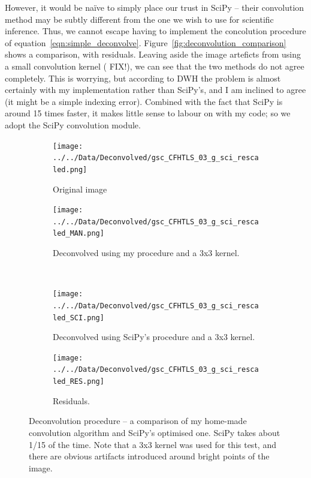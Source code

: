 \documentclass[letterpaper, 11pt]{article}
\def\MORE{{\color{red}{\bf MORE}}\xspace}
\begin{document}
However, it would be na\"ive to simply place our trust in SciPy -- their convolution method may be subtly different from the one we wish to use for scientific inference. Thus, we cannot escape having to implement the concolution procedure of equation~\ref{eqn:simple_deconvolve}. Figure~\vref{fig:deconvolution_comparison} shows a comparison, with residuals. Leaving aside the image arteficts from using a small convolution kernel (\MORE FIX!), we can see that the two methods do not agree completely. This is worrying, but according to DWH the problem is almost certainly with my implementation rather than SciPy's, and I am inclined to agree (it might be a simple indexing error). Combined with the fact that SciPy is around 15 times faster, it makes little sense to labour on with my code; so we adopt the SciPy convolution module.

\begin{figure}
	\def\width{0.3\textwidth}
	\centering
	\begin{subfigure}{\width}
		\texttt{[image: ../../Data/Deconvolved/gsc\_CFHTLS\_03\_g\_sci\_rescaled.png]}
		\caption{Original image}
	\end{subfigure}
	
	\begin{subfigure}{\width}
		\texttt{[image: ../../Data/Deconvolved/gsc\_CFHTLS\_03\_g\_sci\_rescaled\_MAN.png]}
		\caption{Deconvolved using my procedure and a 3x3 kernel.}
	\end{subfigure}
	~
	\begin{subfigure}{\width}
		\texttt{[image: ../../Data/Deconvolved/gsc\_CFHTLS\_03\_g\_sci\_rescaled\_SCI.png]}
		\caption{Deconvolved using SciPy's procedure and a 3x3 kernel.}
	\end{subfigure}
	
	\begin{subfigure}{\width}
		\texttt{[image: ../../Data/Deconvolved/gsc\_CFHTLS\_03\_g\_sci\_rescaled\_RES.png]}
		\caption{Residuals.}
	\end{subfigure}
	\caption{Deconvolution procedure -- a comparison of my home-made convolution algorithm and SciPy's optimised one. SciPy takes about 1/15 of the time. Note that a 3x3 kernel was used for this test, and there are obvious artifacts introduced around bright points of the image.}
	\label{fig:deconvolution_comparison}
\end{figure}


\newpage
{}


\end{document}
